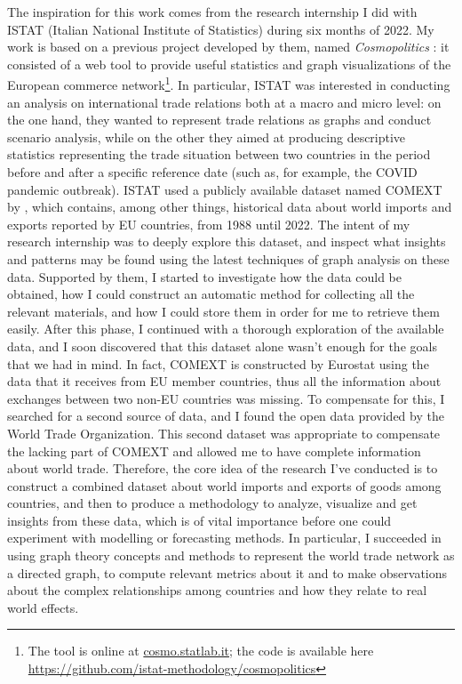 The inspiration for this work comes from the research internship I did with ISTAT (Italian National Institute of Statistics) during six months of 2022. My work is based on a previous project developed by them, named \textit{Cosmopolitics} \cite{bruno2021european}: it consisted of a web tool to provide useful statistics and graph visualizations of the European commerce network\footnote{
    The tool is online at \href{https://cosmo.statlab.it/}{cosmo.statlab.it}; the code is available here \url{https://github.com/istat-methodology/cosmopolitics}}.
In particular, ISTAT was interested in conducting an analysis on international trade relations both at a macro and micro level: on the one hand, they wanted to represent trade relations as graphs and conduct scenario analysis, while on the other they aimed at producing descriptive statistics representing the trade situation between two countries in the period before and after a specific reference date (such as, for example, the COVID pandemic outbreak).
ISTAT used a publicly available dataset named COMEXT by \textcite{eurostat2022comext}, which contains, among other things, historical data about world imports and exports reported by EU countries, from 1988 until 2022.
The intent of my research internship was to deeply explore this dataset, and inspect what insights and patterns may be found using the latest techniques of graph analysis on these data. Supported by them, I started to investigate how the data could be obtained, how I could construct an automatic method for collecting all the relevant materials, and how I could store them in order for me to retrieve them easily. 
After this phase, I continued with a thorough exploration of the available data, and I soon discovered that this dataset alone wasn't enough for the goals that we had in mind. In fact, COMEXT is constructed by Eurostat using the data that it receives from EU member countries, thus all the information about exchanges between two non-EU countries was missing. 
To compensate for this, I searched for a second source of data, and I found the open data provided by the World Trade Organization. This second dataset was appropriate to compensate the lacking part of COMEXT and allowed me to have complete information about world trade.
Therefore, the core idea of the research I've conducted is to construct a combined dataset about world imports and exports of goods among countries, and then to produce a methodology to analyze, visualize and get insights from these data, which is of vital importance before one could experiment with modelling or forecasting methods. In particular, I succeeded in using graph theory concepts and methods to represent the world trade network as a directed graph, to compute relevant metrics about it and to make observations about the complex relationships among countries and how they relate to real world effects.

